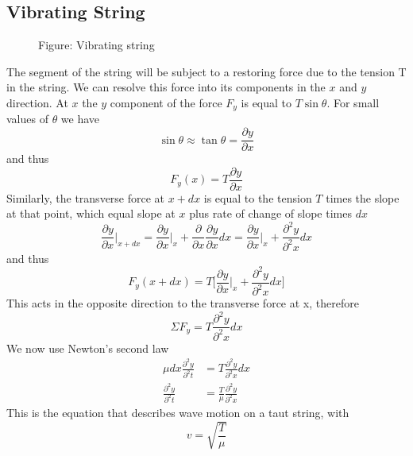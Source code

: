 \documentclass[../../../main.tex]{subfiles}
\begin{document}
\subsection{Vibrating String}
\begin{figure}[t]
    \centering
    \caption*{Figure: Vibrating string}
\end{figure}
The segment of the string will be subject to a restoring force due to the tension T in the string. We can resolve this force into its components in the $x$ and $y$ direction. At $x$ the $y$ component of the force $F_y$ is equal to $T \sin \theta$. For small values of $\theta$ we have
\begin{equation*}
    \sin \theta \approx \tan \theta=\frac{\partial y}{\partial x}
\end{equation*}
and thus 
\begin{equation*}
    F_y(x)= T \frac{\partial y}{\partial x}
\end{equation*}
Similarly, the transverse force at $x + dx$ is equal to the tension $T$ times the slope at that point, which equal slope at $x$ plus rate of change of slope times $dx$
\begin{equation*}
    \frac{\partial y}{\partial x}\bigg |_{x + dx} =\frac{\partial y}{\partial x}\bigg |_{x}+ \frac{\partial }{\partial x} \frac{\partial y}{\partial x} dx= \frac{\partial y}{\partial x}\bigg |_{x}+ \frac{\partial^2 y}{\partial^2 x} dx
\end{equation*}
and thus 
\begin{equation*}
    F_y(x+dx)= T \biggl[\frac{\partial y}{\partial x}\bigg |_{x}+ \frac{\partial^2 y}{\partial^2 x} dx\biggr]
\end{equation*}
This acts in the opposite direction to the transverse force at x, therefore
\begin{equation*}
    \Sigma F_y=T  \frac{\partial^2 y}{\partial^2 x} dx
\end{equation*}
We now use Newton's second law 
\begin{align*}
    \mu dx \frac{\partial^2 y}{\partial^2 t}&= T  \frac{\partial^2 y}{\partial^2 x} dx\\
    \frac{\partial^2 y}{\partial^2 t}&=\frac{T}{\mu} \frac{\partial^2 y}{\partial^2 x}
\end{align*}
This is the equation that describes wave motion on a taut string, with
\begin{equation*}
    v=\sqrt{\frac{T}{\mu}}
\end{equation*}
\end{document}
